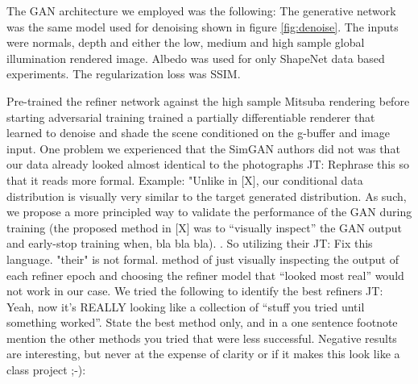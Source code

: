 \documentclass[10pt,twocolumn,letterpaper]{article}
\newcommand{\tompson}[1]{{\color{green} JT: #1}}
\begin{document}




The GAN architecture we employed was the following:  
The generative network was the same model used for denoising shown in figure \ref{fig:denoise}.  The inputs were normals, depth and either the low, medium and high sample global illumination rendered image. Albedo was used for only ShapeNet data based experiments. The regularization loss was SSIM.

Pre-trained the refiner network against the high sample Mitsuba rendering before starting adversarial training trained a partially differentiable renderer that learned to denoise and shade the scene conditioned on the g-buffer and image input. One problem we experienced that the SimGAN authors did not was that our data already looked almost identical to the photographs \tompson{Rephrase this so that it reads more formal. Example: "Unlike in [X], our conditional data distribution is visually very similar to the target generated distribution. As such, we propose a more principled way to validate the performance of the GAN during training (the proposed method in [X] was to ``visually inspect'' the GAN output and early-stop training when, bla bla bla). }. So utilizing their \tompson{Fix this language. "their" is not formal.} method of just visually inspecting the output of each refiner epoch and choosing the refiner model that ``looked most real'' would not work in our case. We tried the following to identify the best refiners \tompson{Yeah, now it's REALLY looking like a collection of ``stuff you tried until something worked''. State the best method only, and in a one sentence footnote mention the other methods you tried that were less successful. Negative results are interesting, but never at the expense of clarity or if it makes this look like a class project ;-)}:
\end{document}

